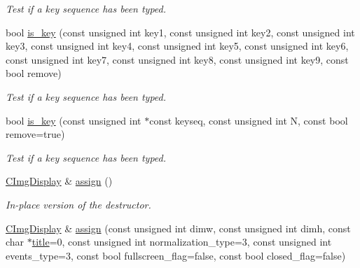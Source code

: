\begin{DoxyCompactItemize}
\begin{DoxyCompactList}\small\item\em Test if a key sequence has been typed. \end{DoxyCompactList}\item 
\hypertarget{structcimg__library_1_1_c_img_display_aa8cb87d0dcad292700f114f666da0a97}{bool \hyperlink{structcimg__library_1_1_c_img_display_aa8cb87d0dcad292700f114f666da0a97}{is\-\_\-key} (const unsigned int key1, const unsigned int key2, const unsigned int key3, const unsigned int key4, const unsigned int key5, const unsigned int key6, const unsigned int key7, const unsigned int key8, const unsigned int key9, const bool remove)}\label{structcimg__library_1_1_c_img_display_aa8cb87d0dcad292700f114f666da0a97}

\begin{DoxyCompactList}\small\item\em Test if a key sequence has been typed. \end{DoxyCompactList}\item 
\hypertarget{structcimg__library_1_1_c_img_display_ae194d425e90c8797071a9d7d2b9fdfc4}{bool \hyperlink{structcimg__library_1_1_c_img_display_ae194d425e90c8797071a9d7d2b9fdfc4}{is\-\_\-key} (const unsigned int $\ast$const keyseq, const unsigned int N, const bool remove=true)}\label{structcimg__library_1_1_c_img_display_ae194d425e90c8797071a9d7d2b9fdfc4}

\begin{DoxyCompactList}\small\item\em Test if a key sequence has been typed. \end{DoxyCompactList}\item 
\hypertarget{structcimg__library_1_1_c_img_display_a333627dc25d0416c30a0c55982d293b1}{\hyperlink{structcimg__library_1_1_c_img_display}{C\-Img\-Display} \& \hyperlink{structcimg__library_1_1_c_img_display_a333627dc25d0416c30a0c55982d293b1}{assign} ()}\label{structcimg__library_1_1_c_img_display_a333627dc25d0416c30a0c55982d293b1}

\begin{DoxyCompactList}\small\item\em In-\/place version of the destructor. \end{DoxyCompactList}\item 
\hypertarget{structcimg__library_1_1_c_img_display_a3f8c36f69f66721ea534b4a99b78e3f9}{\hyperlink{structcimg__library_1_1_c_img_display}{C\-Img\-Display} \& \hyperlink{structcimg__library_1_1_c_img_display_a3f8c36f69f66721ea534b4a99b78e3f9}{assign} (const unsigned int dimw, const unsigned int dimh, const char $\ast$\hyperlink{structcimg__library_1_1_c_img_display_afa41a285232ef89035e1832c7dc92ec1}{title}=0, const unsigned int normalization\-\_\-type=3, const unsigned int events\-\_\-type=3, const bool fullscreen\-\_\-flag=false, const bool closed\-\_\-flag=false)}\label{structcimg__library_1_1_c_img_display_a3f8c36f69f66721ea534b4a99b78e3f9}


\end{DoxyCompactItemize}
